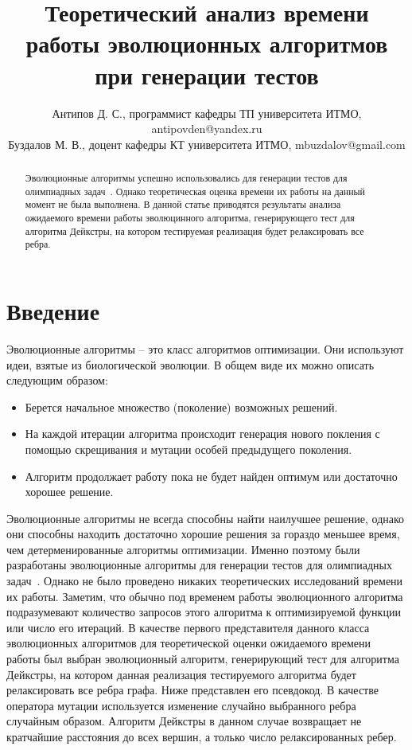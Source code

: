\documentclass{spisok-article}
\title{Теоретический анализ времени работы эволюционных алгоритмов при генерации тестов
}
\author{
  Антипов Д. С.,
  программист кафедры ТП университета ИТМО,
  antipovden@yandex.ru \\
  Буздалов М. В.,
  доцент кафедры КТ университета ИТМО,
  mbuzdalov@gmail.com
}
\begin{document}
\maketitle

\begin{abstract}
Эволюционные алгоритмы успешно использовались для генерации тестов для олимпиадных задач~\cite{max}.
Однако теоретическая оценка времени их работы на данный момент не была выполнена.
В данной статье приводятся результаты анализа ожидаемого времени работы эволюцинного алгоритма,
генерирующего тест для алгоритма Дейкстры, на котором тестируемая реализация будет релаксировать все ребра.
\end{abstract}

\section{Введение}
Эволюционные алгоритмы -- это класс алгоритмов оптимизации. Они используют идеи, взятые из биологической эволюции. В общем виде их можно описать следующим образом:
\begin{itemize}
 \item Берется начальное множество (поколение) возможных решений.
 \item На каждой итерации алгоритма происходит генерация нового покления с помощью скрещивания и мутации особей предыдущего поколения.
 \item Алгоритм продолжает работу пока не будет найден оптимум или достаточно хорошее решение.
\end{itemize}
Эволюционные алгоритмы не всегда способны найти наилучшее решение, однако они способны находить достаточно хорошие решения за гораздо меньшее время, чем детерменированные алгоритмы оптимизации. 
Именно поэтому были разработаны эволюционные алгоритмы для генерации тестов для олимпиадных задач~\cite{max}. Однако не было проведено никаких теоретических исследований времени их работы. Заметим, что обычно под временем работы эволюционного алгоритма подразумевают количество запросов этого алгоритма к оптимизируемой функции или число его итераций.
В качестве первого представителя данного класса эволюционных алгоритмов для теоретической оценки ожидаемого времени работы был выбран эволюционный алгоритм, генерирующий тест для алгоритма Дейкстры, на котором данная реализация тестируемого алгоритма будет релаксировать все ребра графа. Ниже представлен его псевдокод. 
В качестве оператора мутации используется изменение случайно выбранного ребра случайным образом.
Алгоритм Дейкстры в данном случае возвращает не кратчайшие расстояния до всех вершин, а только число релаксированных ребер.
\end{document}
